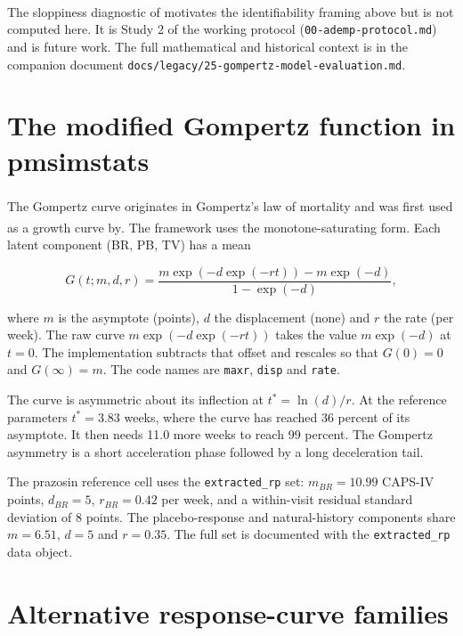 \documentclass[
  11pt,
]{article}
\newcounter{none} %
\begin{document}
The sloppiness diagnostic of\textsuperscript{} motivates the
identifiability framing above but is not computed here. It is Study 2
of the working protocol (\texttt{00-ademp-protocol.md}) and is future work.
The full mathematical and historical context is in the companion
document \texttt{docs/legacy/25-gompertz-model-evaluation.md}.

\section{The modified Gompertz function in pmsimstats}\label{the-modified-gompertz-function-in-pmsimstats}

The Gompertz curve originates in Gompertz's law of mortality\textsuperscript{} and was first used as a growth curve by\textsuperscript{}. The framework uses the monotone-saturating form.
Each latent component (BR, PB, TV) has a mean

\begin{equation}
G(t; m, d, r) = \frac{m\exp\!\left(-d\exp(-r t)\right) - m\exp(-d)}
                     {1 - \exp(-d)},
\label{eq:gompertz}
\end{equation}

where \(m\) is the asymptote (points), \(d\) the displacement (none) and
\(r\) the rate (per week). The raw curve \(m\exp(-d\exp(-rt))\) takes the
value \(m\exp(-d)\) at \(t = 0\). The implementation subtracts that
offset and rescales so that \(G(0) = 0\) and \(G(\infty) = m\). The code
names are \texttt{maxr}, \texttt{disp} and \texttt{rate}.

The curve is asymmetric about its inflection at
\(t^\ast = \ln(d)/r\). At the reference parameters \(t^\ast =
3.83\) weeks, where the curve has reached
36 percent of its asymptote. It
then needs 11.0 more
weeks to reach 99 percent. The Gompertz asymmetry is a short
acceleration phase followed by a long deceleration tail.

The prazosin reference cell uses the \texttt{extracted\_rp} set:
\(m_{BR} = 10.99\) CAPS-IV points,
\(d_{BR} = 5\), \(r_{BR} = 0.42\) per week, and a
within-visit residual standard deviation of 8 points. The
placebo-response and natural-history components share
\(m = 6.51\),
\(d = 5\) and \(r = 0.35\). The full set is documented with the
\texttt{extracted\_rp} data object.

\section{Alternative response-curve families}\label{alternative-response-curve-families}
\end{document}
